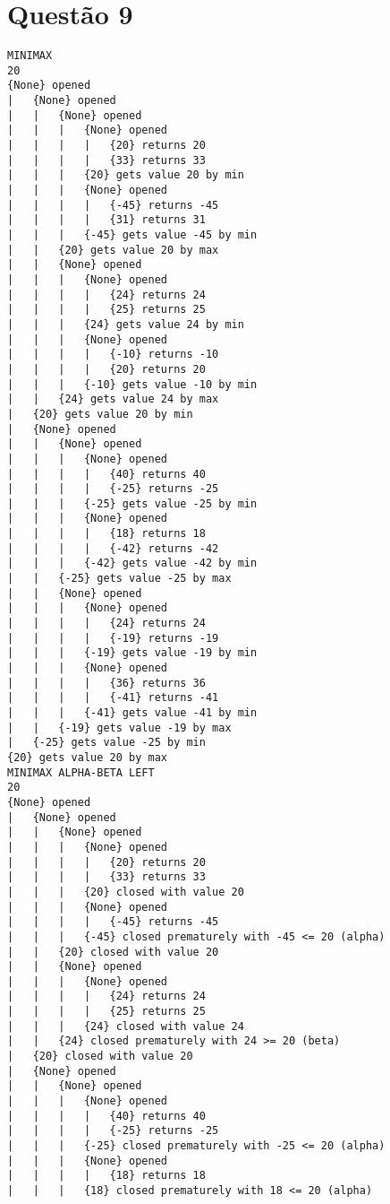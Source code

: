 \documentclass{article}
\begin{document}
\newpage

\section{Questão 9}

\begin{verbatim}
MINIMAX
20
{None} opened
|   {None} opened
|   |   {None} opened
|   |   |   {None} opened
|   |   |   |   {20} returns 20
|   |   |   |   {33} returns 33
|   |   |   {20} gets value 20 by min
|   |   |   {None} opened
|   |   |   |   {-45} returns -45
|   |   |   |   {31} returns 31
|   |   |   {-45} gets value -45 by min
|   |   {20} gets value 20 by max
|   |   {None} opened
|   |   |   {None} opened
|   |   |   |   {24} returns 24
|   |   |   |   {25} returns 25
|   |   |   {24} gets value 24 by min
|   |   |   {None} opened
|   |   |   |   {-10} returns -10
|   |   |   |   {20} returns 20
|   |   |   {-10} gets value -10 by min
|   |   {24} gets value 24 by max
|   {20} gets value 20 by min
|   {None} opened
|   |   {None} opened
|   |   |   {None} opened
|   |   |   |   {40} returns 40
|   |   |   |   {-25} returns -25
|   |   |   {-25} gets value -25 by min
|   |   |   {None} opened
|   |   |   |   {18} returns 18
|   |   |   |   {-42} returns -42
|   |   |   {-42} gets value -42 by min
|   |   {-25} gets value -25 by max
|   |   {None} opened
|   |   |   {None} opened
|   |   |   |   {24} returns 24
|   |   |   |   {-19} returns -19
|   |   |   {-19} gets value -19 by min
|   |   |   {None} opened
|   |   |   |   {36} returns 36
|   |   |   |   {-41} returns -41
|   |   |   {-41} gets value -41 by min
|   |   {-19} gets value -19 by max
|   {-25} gets value -25 by min
{20} gets value 20 by max
MINIMAX ALPHA-BETA LEFT
20
{None} opened
|   {None} opened
|   |   {None} opened
|   |   |   {None} opened
|   |   |   |   {20} returns 20
|   |   |   |   {33} returns 33
|   |   |   {20} closed with value 20
|   |   |   {None} opened
|   |   |   |   {-45} returns -45
|   |   |   {-45} closed prematurely with -45 <= 20 (alpha)
|   |   {20} closed with value 20
|   |   {None} opened
|   |   |   {None} opened
|   |   |   |   {24} returns 24
|   |   |   |   {25} returns 25
|   |   |   {24} closed with value 24
|   |   {24} closed prematurely with 24 >= 20 (beta)
|   {20} closed with value 20
|   {None} opened
|   |   {None} opened
|   |   |   {None} opened
|   |   |   |   {40} returns 40
|   |   |   |   {-25} returns -25
|   |   |   {-25} closed prematurely with -25 <= 20 (alpha)
|   |   |   {None} opened
|   |   |   |   {18} returns 18
|   |   |   {18} closed prematurely with 18 <= 20 (alpha)

\end{verbatim}
\end{document}
